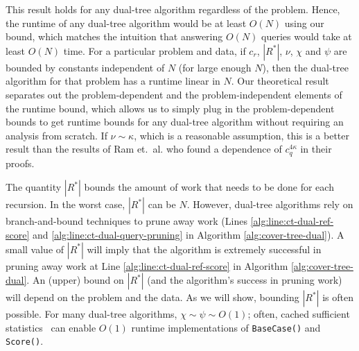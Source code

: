This result holds for any dual-tree algorithm regardless of the problem. Hence,
the runtime of any dual-tree algorithm
would be at least $O(N)$ using our bound, which matches the intuition that
answering $O(N)$ queries would take at least $O(N)$ time. For a particular
problem and data, if $c_r$, $|R^*|$, $\nu$, $\chi$ and
$\psi$ are bounded by constants independent of $N$ (for large enough $N$), then
the dual-tree algorithm for that problem has a runtime linear in $N$. Our
theoretical result separates out the problem-dependent and the
problem-independent elements of the runtime bound, which allows us to simply
plug in the problem-dependent bounds to get runtime bounds for any dual-tree
algorithm without requiring an analysis from scratch.
If $\nu \sim \kappa$, which is a reasonable assumption, this is a better result
than the results of Ram et.~al.  \cite{ram2009} who found a dependence of
$c_q^{4 \kappa}$ in their proofs.

The quantity $|R^*|$ bounds the amount of work that needs to be done for each
recursion. In the worst case, $|R^*|$ can be $N$. However,
dual-tree algorithms rely on branch-and-bound techniques to prune away
work (Lines \ref{alg:line:ct-dual-ref-score} and
\ref{alg:line:ct-dual-query-pruning} in Algorithm \ref{alg:cover-tree-dual}). A
small value of $|R^*|$ will imply that the algorithm is extremely successful in
pruning away work at Line \ref{alg:line:ct-dual-ref-score} in Algorithm
\ref{alg:cover-tree-dual}. An (upper) bound on $|R^*|$ (and the algorithm's
success in pruning work) will depend on the problem and the data.  As we will
show, bounding $|R^*|$ is often possible. %
For many dual-tree algorithms, $\chi \sim \psi \sim O(1)$; often, cached
sufficient statistics~\cite{moore2000anchors} can enable $O(1)$ runtime
implementations of \texttt{BaseCase()} and \texttt{Score()}.

